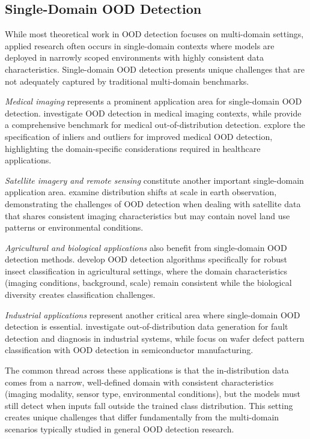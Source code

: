 \documentclass[11pt, oneside]{book}
\theoremstyle{plain}
\theoremstyle{definition}
\theoremstyle{remark}
\begin{document}
\subsection{Single-Domain OOD Detection}

While most theoretical work in OOD detection focuses on multi-domain settings, applied research often occurs in single-domain contexts where models are deployed in narrowly scoped environments with highly consistent data characteristics. Single-domain OOD detection presents unique challenges that are not adequately captured by traditional multi-domain benchmarks.

\emph{Medical imaging} represents a prominent application area for single-domain OOD detection. \citet{zhang2021out} investigate OOD detection in medical imaging contexts, while \citet{cao2020benchmark} provide a comprehensive benchmark for medical out-of-distribution detection. \citet{narayanaswamy2023exploring} explore the specification of inliers and outliers for improved medical OOD detection, highlighting the domain-specific considerations required in healthcare applications.

\emph{Satellite imagery and remote sensing} constitute another important single-domain application area. \citet{ekim2024distribution} examine distribution shifts at scale in earth observation, demonstrating the challenges of OOD detection when dealing with satellite data that shares consistent imaging characteristics but may contain novel land use patterns or environmental conditions.

\emph{Agricultural and biological applications} also benefit from single-domain OOD detection methods. \citet{saadati2024out} develop OOD detection algorithms specifically for robust insect classification in agricultural settings, where the domain characteristics (imaging conditions, background, scale) remain consistent while the biological diversity creates classification challenges.

\emph{Industrial applications} represent another critical area where single-domain OOD detection is essential. \citet{kafunah2023out} investigate out-of-distribution data generation for fault detection and diagnosis in industrial systems, while \citet{kim2021wafer} focus on wafer defect pattern classification with OOD detection in semiconductor manufacturing.

The common thread across these applications is that the in-distribution data comes from a narrow, well-defined domain with consistent characteristics (imaging modality, sensor type, environmental conditions), but the models must still detect when inputs fall outside the trained class distribution. This setting creates unique challenges that differ fundamentally from the multi-domain scenarios typically studied in general OOD detection research.
\end{document}
